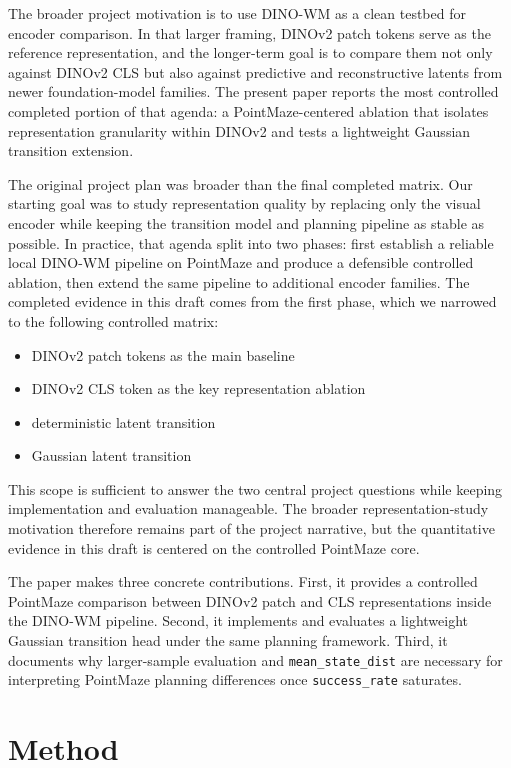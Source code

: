 \documentclass[11pt]{article}
\begin{document}
The broader project motivation is to use DINO-WM as a clean testbed for encoder comparison. In that larger framing, DINOv2 patch tokens serve as the reference representation, and the longer-term goal is to compare them not only against DINOv2 CLS but also against predictive and reconstructive latents from newer foundation-model families. The present paper reports the most controlled completed portion of that agenda: a PointMaze-centered ablation that isolates representation granularity within DINOv2 and tests a lightweight Gaussian transition extension.

The original project plan was broader than the final completed matrix. Our starting goal was to study representation quality by replacing only the visual encoder while keeping the transition model and planning pipeline as stable as possible. In practice, that agenda split into two phases: first establish a reliable local DINO-WM pipeline on PointMaze and produce a defensible controlled ablation, then extend the same pipeline to additional encoder families. The completed evidence in this draft comes from the first phase, which we narrowed to the following controlled matrix:

\begin{itemize}
\item DINOv2 patch tokens as the main baseline
\item DINOv2 CLS token as the key representation ablation
\item deterministic latent transition
\item Gaussian latent transition
\end{itemize}

This scope is sufficient to answer the two central project questions while keeping implementation and evaluation manageable. The broader representation-study motivation therefore remains part of the project narrative, but the quantitative evidence in this draft is centered on the controlled PointMaze core.

The paper makes three concrete contributions. First, it provides a controlled PointMaze comparison between DINOv2 patch and CLS representations inside the DINO-WM pipeline. Second, it implements and evaluates a lightweight Gaussian transition head under the same planning framework. Third, it documents why larger-sample evaluation and \texttt{mean\_state\_dist} are necessary for interpreting PointMaze planning differences once \texttt{success\_rate} saturates.

\section{Method}
\end{document}
